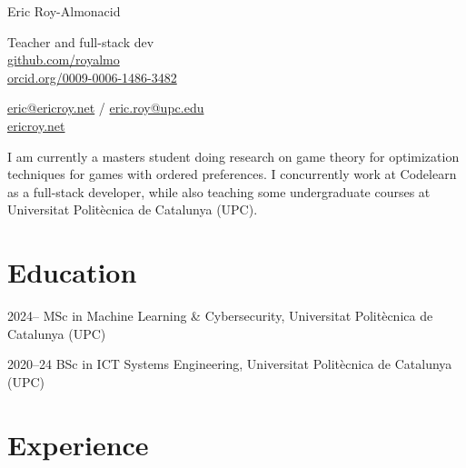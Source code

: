 \documentclass[a4paper]{report}
\newcommand{\namefont}[1]{{\Huge{#1}}}
\begin{document}
    \raggedright{}

    \namefont{Eric Roy-Almonacid}


    \vspace{1.7em}
    \begin{minipage}[t]{0.595\textwidth}
        Teacher and full-stack dev\\
        \href{https://github.com/royalmo}{github.com/royalmo}\\
	      \href{https://orcid.org/0009-0006-1486-3482}{orcid.org/0009-0006-1486-3482}
    \end{minipage}
    \begin{minipage}[t]{0.395\textwidth}
        \flushright{}
        \href{mailto:eric@ericroy.net}{eric@ericroy.net} / \href{mailto:eric.roy@upc.edu}{eric.roy@upc.edu} \\
        \href{https://ericroy.net}{ericroy.net}
    \end{minipage}

    \vspace{1.7em}
    
I am currently a masters student doing research on game theory for optimization techniques for games with ordered preferences. 
I concurrently work at Codelearn as a full-stack developer, while also teaching some undergraduate courses at Universitat Politècnica de Catalunya (UPC).

\vspace{-1em}
\section*{Education}

\begin{tablist}
\item[2024--] \tab{}MSc in Machine Learning \& Cybersecurity, Universitat Politècnica de Catalunya (UPC)
\item[2020--24] \tab{}BSc in ICT Systems Engineering, Universitat Politècnica de Catalunya (UPC)
\end{tablist}

\vspace{-1em}
\section*{Experience}
\end{document}
